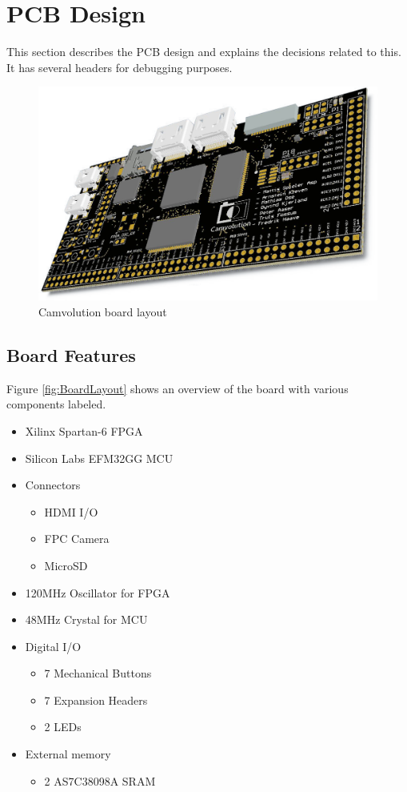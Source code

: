 \section{PCB Design}
This section describes the PCB design and explains the decisions related to this.
It has several headers for debugging purposes.

\begin{figure}[h]
    \includegraphics[width=\linewidth]{img/OverviewCamvolutionKit}
    \caption{Camvolution board layout}
\end{figure}

\subsection{Board Features}
Figure \ref{fig:BoardLayout} shows an overview of the board with various components labeled.

\begin{itemize}
    \item Xilinx Spartan-6 FPGA
    \item Silicon Labs EFM32GG MCU
    \item Connectors
        \begin{itemize}
            \item HDMI I/O
            \item FPC Camera
            \item MicroSD
        \end{itemize}
    \item 120MHz Oscillator for FPGA
    \item 48MHz Crystal for MCU
    \item Digital I/O
        \begin{itemize}
            \item 7 Mechanical Buttons
            \item 7 Expansion Headers
            \item 2 LEDs
        \end{itemize}
    \item External memory
        \begin{itemize}
            \item 2 AS7C38098A SRAM
        \end{itemize}
\end{itemize}

